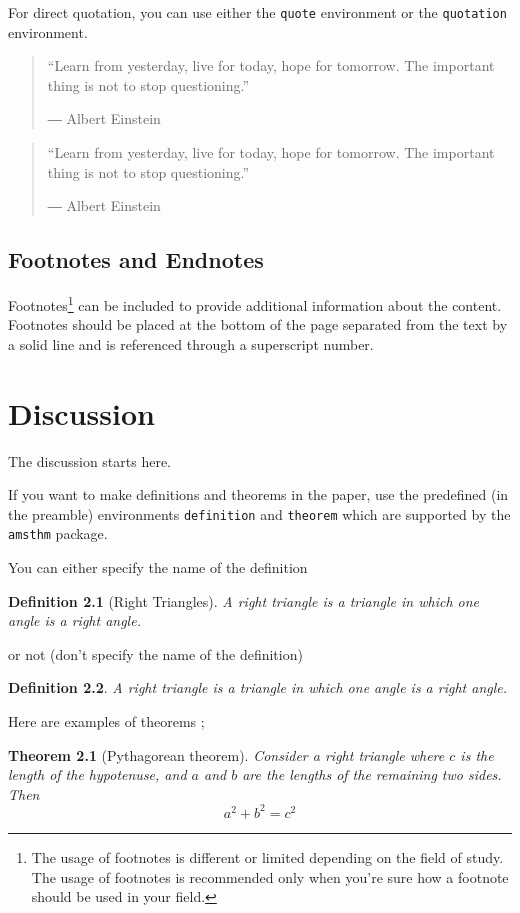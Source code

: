 \documentclass{report}
\newtheorem{theorem}{Theorem} %
\newtheorem{definition}{Definition} %
\begin{document}
For direct quotation, you can use either the \texttt{quote} environment or the \texttt{quotation} environment.
\begin{quote}
“Learn from yesterday, live for today, hope for tomorrow. The important thing is not to stop questioning.” \par
― Albert Einstein 
\end{quote}

\begin{quotation}
“Learn from yesterday, live for today, hope for tomorrow. The important thing is not to stop questioning.” \par
― Albert Einstein 
\end{quotation}

\section{Footnotes and Endnotes}\label{sec:footnotes_endnotes}

Footnotes\footnote{The usage of footnotes is different or limited depending on the field of study. The usage of footnotes is recommended only when you’re sure how a footnote should be used in your field.} can be included to provide additional information about the content. Footnotes should be placed at the bottom of the page separated from the text by a solid line and is referenced through a superscript number.

\chapter{Discussion}\label{chap:discussion}
The discussion starts here.

If you want to make definitions and theorems in the paper, use the predefined (in the preamble) environments \texttt{definition} and \texttt{theorem} which are supported by the \texttt{amsthm} package.

You can either specify the name of the definition
\begin{definition}[Right Triangles]
A right triangle is a triangle in which one angle is a right angle.
\end{definition}
or not (don't specify the name of the definition)
\begin{definition}
A right triangle is a triangle in which one angle is a right angle.
\end{definition}

Here are examples of theorems ;
\begin{theorem}[Pythagorean theorem]
Consider a right triangle where \(c\) is the length of the hypotenuse, and \(a\) and \(b\) are the lengths of the remaining two sides.
Then
\begin{equation}
a^2+b^2=c^2
\end{equation}
\end{theorem}
\end{document}
